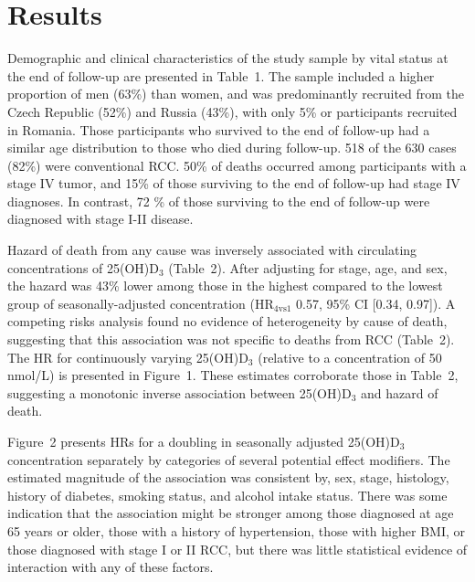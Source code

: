 \documentclass[a4paper,11pt]{article}
\begin{document}
\section*{Results}
Demographic and clinical characteristics of the study sample by vital status at 
the end of follow-up are presented in Table~1. The sample included a higher 
proportion of men (63\%) than women, and was predominantly recruited from the 
Czech Republic (52\%) and Russia (43\%), with only 5\% or participants 
recruited in Romania. Those participants who survived to the end of follow-up 
had a similar age distribution to those who died during follow-up. 518 
of the 630 cases (82\%) were conventional RCC. 50\% of deaths occurred among 
participants with a stage IV tumor, and 15\% of those surviving to the end of 
follow-up had stage IV diagnoses. In contrast, 72 \% of those surviving to the 
end of follow-up were diagnosed with stage I-II disease.

Hazard of death from any cause was inversely associated with 
circulating concentrations of 25(OH)D$_3$ (Table~2). After adjusting for 
stage, age, and sex, the hazard was 43\% lower among those in the highest 
compared to the lowest group of seasonally-adjusted concentration 
(HR$_{4\text{vs}1}$ 0.57, 95\% CI [0.34, 0.97]). A competing risks analysis 
found no evidence of heterogeneity by cause of death, suggesting that this 
association was not specific to deaths from RCC (Table~2). The HR for 
continuously varying 25(OH)D$_3$ (relative to a concentration of 50 nmol/L) is 
presented in Figure~1. These estimates corroborate those in Table~2, suggesting 
a monotonic inverse association between 25(OH)D$_3$ and hazard of death.

Figure~2 presents HRs for a doubling in seasonally adjusted 25(OH)D$_3$ 
concentration separately by categories of several potential effect modifiers. 
The estimated magnitude of the association was consistent by, sex, stage, 
histology, history of diabetes, smoking status, and alcohol intake status. 
There was some indication that the association might be stronger among those 
diagnosed at age 65 years or older, those with a history of hypertension, those 
with higher BMI, or those diagnosed with stage I or II RCC, but there was 
little statistical evidence of interaction with any of these factors. 

\end{document}
